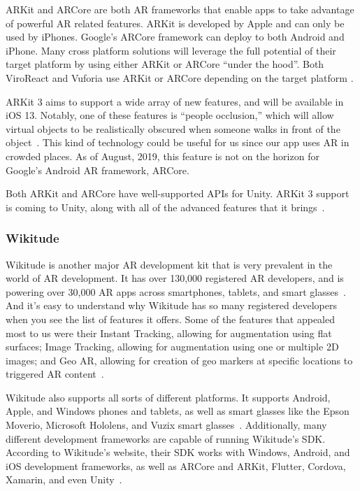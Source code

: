 \documentclass[a4paper, 10pt, american, titlepage]{article}
\begin{document}
ARKit and ARCore are both AR frameworks that enable apps to take advantage of
powerful AR related features. ARKit is developed by Apple and can only be used
by iPhones. Google's ARCore framework can deploy to both Android and iPhone.
Many cross platform solutions will leverage the full potential of their target
platform by using either ARKit or ARCore ``under the hood''. Both ViroReact and
Vuforia use ARKit or ARCore depending on the target platform
\autocites{vuforiaFusion}{moon2018}.

ARKit 3 aims to support a wide array of new features, and will be available in
iOS 13. Notably, one of these features is ``people occlusion,'' which will allow
virtual objects to be realistically obscured when someone walks in front of the
object~\autocite{apple2019}. This kind of technology could be useful for us
since our app uses AR in crowded places.  As of August, 2019, this feature is
not on the horizon for Google's Android AR framework, ARCore.

Both ARKit and ARCore have well-supported APIs for Unity. ARKit 3 support is
coming to Unity, along with all of the advanced features that it
brings~\autocite{stinson2019}.

\subsubsection{Wikitude}
\label{sec:wikitude}

Wikitude is another major AR development kit that is very prevalent in the world
of AR development. It has over 130,000 registered AR developers, and is powering
over 30,000 AR apps across smartphones, tablets, and smart glasses~\autocite{wikitude2018}.
And it's easy to understand why Wikitude has so many registered developers
when you see the list of features it offers. Some of the features that appealed
most to us were their Instant Tracking, allowing for augmentation using flat surfaces;
Image Tracking, allowing for augmentation using one or multiple 2D images; and
Geo AR, allowing for creation of geo markers at specific locations to triggered AR
content~\autocite{wikitude2018}. 

Wikitude also supports all sorts of different platforms. It supports Android, Apple,
and Windows phones and tablets, as well as smart glasses like the Epson Moverio,
Microsoft Hololens, and Vuzix smart glasses~\autocite{wikitude2018}. Additionally,
many different development frameworks are capable of running Wikitude's SDK.
According to Wikitude's website, their SDK works with Windows, Android, and iOS
development frameworks, as well as ARCore and ARKit, Flutter, Cordova, Xamarin,
and even Unity~\autocite{wikitude2018}. 
\end{document}
